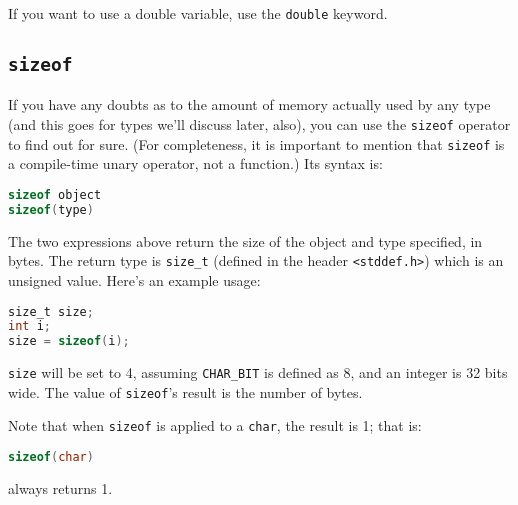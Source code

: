 If you want to use a double variable, use the \texttt{double} keyword.

\subsection{\texttt{sizeof}}
If you have any doubts as to the amount of memory actually used by any type
(and this goes for types we'll discuss later, also), you can use the
\texttt{sizeof} operator to find out for sure. (For completeness, it is
important to mention that \texttt{sizeof} is a compile-time unary operator, not
a function.) Its syntax is:

\lstset{basicstyle=\scriptsize, numbers=left, captionpos=b, tabsize=4}
\begin{lstlisting}[caption=Section \thesection listing \arabic{varcnt},language={C},
breaklines=true,xleftmargin=15pt,label=lst:section\thesection listing\arabic{varcnt}]
sizeof object
sizeof(type)
\end{lstlisting}

The two expressions above return the size of the object and type specified, in
bytes. The return type is \texttt{size\_t} (defined in the header
\texttt{\textless{}stddef.h\textgreater{}}) which is an unsigned value. Here's
an example usage:

\lstset{basicstyle=\scriptsize, numbers=left, captionpos=b, tabsize=4}
\begin{lstlisting}[caption=Section \thesection listing \arabic{varcnt},language={C},
breaklines=true,xleftmargin=15pt,label=lst:section\thesection listing\arabic{varcnt}]
size_t size;
int i;
size = sizeof(i);
\end{lstlisting}

\texttt{size} will be set to 4, assuming \texttt{CHAR\_BIT} is defined as 8,
and an integer is 32 bits wide. The value of \texttt{sizeof}'s result is the
number of bytes.

Note that when \texttt{sizeof} is applied to a \texttt{char}, the result is 1;
that is:

\lstset{basicstyle=\scriptsize, numbers=left, captionpos=b, tabsize=4}
\begin{lstlisting}[caption=Section \thesection listing \arabic{varcnt},language={C},
breaklines=true,xleftmargin=15pt,label=lst:section\thesection listing\arabic{varcnt}]
sizeof(char)
\end{lstlisting}

always returns 1.

